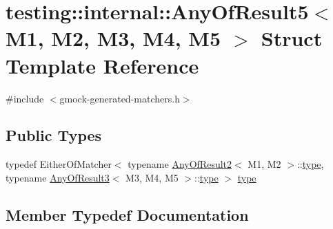 \hypertarget{structtesting_1_1internal_1_1_any_of_result5}{}\section{testing\+::internal\+::Any\+Of\+Result5$<$ M1, M2, M3, M4, M5 $>$ Struct Template Reference}
\label{structtesting_1_1internal_1_1_any_of_result5}


{\ttfamily \#include $<$gmock-\/generated-\/matchers.\+h$>$}

\subsection*{Public Types}
\begin{DoxyCompactItemize}
\item 
typedef Either\+Of\+Matcher$<$ typename \mbox{\hyperlink{structtesting_1_1internal_1_1_any_of_result2}{Any\+Of\+Result2}}$<$ M1, M2 $>$\+::\mbox{\hyperlink{structtesting_1_1internal_1_1_any_of_result5_a459a06dc5791313dce942668714f0c99}{type}}, typename \mbox{\hyperlink{structtesting_1_1internal_1_1_any_of_result3}{Any\+Of\+Result3}}$<$ M3, M4, M5 $>$\+::\mbox{\hyperlink{structtesting_1_1internal_1_1_any_of_result5_a459a06dc5791313dce942668714f0c99}{type}} $>$ \mbox{\hyperlink{structtesting_1_1internal_1_1_any_of_result5_a459a06dc5791313dce942668714f0c99}{type}}
\end{DoxyCompactItemize}


\subsection{Member Typedef Documentation}
\mbox{\label{structtesting_1_1internal_1_1_any_of_result5_a459a06dc5791313dce942668714f0c99}} 
